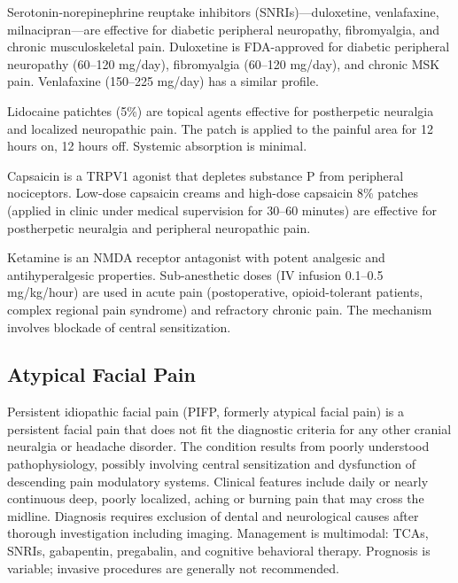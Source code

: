 Serotonin-norepinephrine reuptake inhibitors (SNRIs)---duloxetine, venlafaxine, milnacipran---are effective for diabetic peripheral neuropathy, fibromyalgia, and chronic musculoskeletal pain. Duloxetine is FDA-approved for diabetic peripheral neuropathy (60--120 mg/day), fibromyalgia (60--120 mg/day), and chronic MSK pain. Venlafaxine (150--225 mg/day) has a similar profile.

Lidocaine patichtes (5\%) are topical agents effective for postherpetic neuralgia and localized neuropathic pain. The patch is applied to the painful area for 12 hours on, 12 hours off. Systemic absorption is minimal.

Capsaicin is a TRPV1 agonist that depletes substance P from peripheral nociceptors. Low-dose capsaicin creams and high-dose capsaicin 8\% patches (applied in clinic under medical supervision for 30--60 minutes) are effective for postherpetic neuralgia and peripheral neuropathic pain.

Ketamine is an NMDA receptor antagonist with potent analgesic and antihyperalgesic properties. Sub-anesthetic doses (IV infusion 0.1--0.5 mg/kg/hour) are used in acute pain (postoperative, opioid-tolerant patients, complex regional pain syndrome) and refractory chronic pain. The mechanism involves blockade of central sensitization.

\subsection{Atypical Facial Pain}
\label{sec:Atypical Facial Pain}
Persistent idiopathic facial pain (PIFP, formerly atypical facial pain) is a persistent facial pain that does not fit the diagnostic criteria for any other cranial neuralgia or headache disorder. The condition results from poorly understood pathophysiology, possibly involving central sensitization and dysfunction of descending pain modulatory systems. Clinical features include daily or nearly continuous deep, poorly localized, aching or burning pain that may cross the midline. Diagnosis requires exclusion of dental and neurological causes after thorough investigation including imaging. Management is multimodal: TCAs, SNRIs, gabapentin, pregabalin, and cognitive behavioral therapy. Prognosis is variable; invasive procedures are generally not recommended.

